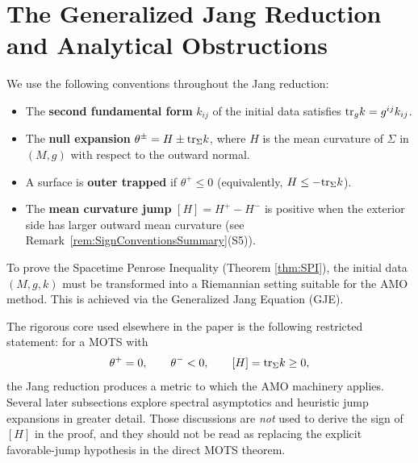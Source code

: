 \section{The Generalized Jang Reduction and Analytical Obstructions}
\label{sec:Jang}

\begin{remark}
We use the following conventions throughout the Jang reduction:
\begin{itemize}
    \item The \textbf{second fundamental form} $k_{ij}$ of the initial data satisfies $\mathrm{tr}_g k = g^{ij} k_{ij}$.
    \item The \textbf{null expansion} $\theta^\pm = H \pm \mathrm{tr}_\Sigma k$, where $H$ is the mean curvature of $\Sigma$ in $(M,g)$ with respect to the outward normal.
    \item A surface is \textbf{outer trapped} if $\theta^+ \le 0$ (equivalently, $H \le -\mathrm{tr}_\Sigma k$).
    \item The \textbf{mean curvature jump} $[H] = H^+ - H^-$ is positive when the exterior side has larger outward mean curvature (see Remark~\ref{rem:SignConventionsSummary}(S5)).
\end{itemize}
\end{remark}

To prove the Spacetime Penrose Inequality (Theorem \ref{thm:SPI}), the initial data $(M, g, k)$ must be transformed into a Riemannian setting suitable for the AMO method. This is achieved via the Generalized Jang Equation (GJE).

\begin{remark}
The rigorous core used elsewhere in the paper is the following restricted statement: for a MOTS with
\[
    \theta^+ = 0, \qquad \theta^- < 0, \qquad [H] = \mathrm{tr}_\Sigma k \ge 0,
\]
the Jang reduction produces a metric to which the AMO machinery applies. Several later subsections explore spectral asymptotics and heuristic jump expansions in greater detail. Those discussions are \emph{not} used to derive the sign of $[H]$ in the proof, and they should not be read as replacing the explicit favorable-jump hypothesis in the direct MOTS theorem.
\end{remark}

